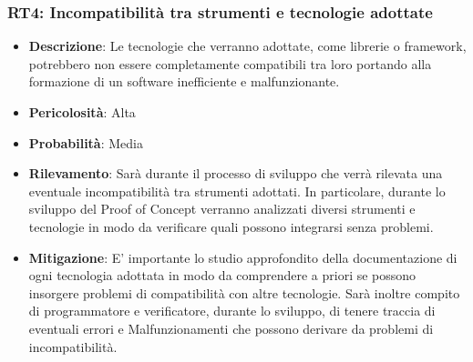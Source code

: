 \documentclass[a4paper, 12pt]{article}
\newcommand{\glossario}[1]{\fontfamily{lmr}\selectfont{\textit{#1\textsubscript{\small G}}}}
\begin{document}
\subsubsection{RT4: Incompatibilità tra strumenti e tecnologie adottate}
\begin{itemize}
    \item \textbf{Descrizione}: Le tecnologie che verranno adottate, come librerie o framework, potrebbero non essere completamente compatibili
    tra loro portando alla formazione di un software inefficiente e malfunzionante.
    \item \textbf{Pericolosità}: Alta
    \item \textbf{Probabilità}: Media
    \item \textbf{Rilevamento}: Sarà durante il processo di sviluppo che verrà rilevata una eventuale incompatibilità tra strumenti adottati.
    In particolare, durante lo sviluppo del Proof of Concept verranno analizzati diversi strumenti e tecnologie in modo da verificare quali 
    possono integrarsi senza problemi.
    \item \textbf{Mitigazione}: E' importante lo studio approfondito della documentazione di ogni tecnologia adottata in modo da comprendere 
    a priori se possono insorgere problemi di compatibilità con altre tecnologie.
    Sarà inoltre compito di programmatore e verificatore, durante lo sviluppo, di tenere traccia di eventuali errori e Malfunzionamenti
    che possono derivare da problemi di incompatibilità.
\end{itemize}
\glossario{Termine glossario}
\end{document}
